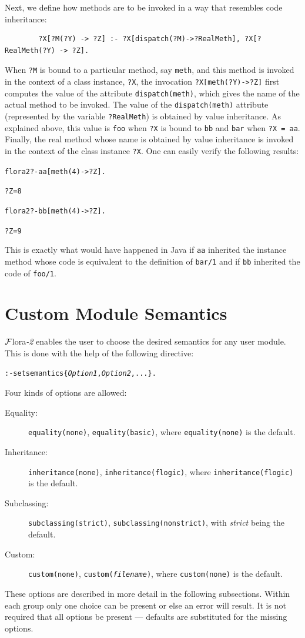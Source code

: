 \documentclass[11pt]{article}
\newcommand{\FLSYSTEM}{{\mbox{\sc ${\cal F}${lora}\rm\emph{-2}}}\xspace}
\newcommand{\prompt}{flora2 ?- }
\begin{document}
Next, we define how methods are to be invoked in a way that resembles
code inheritance:
\begin{verbatim}
        ?X[?M(?Y) -> ?Z] :- ?X[dispatch(?M)->?RealMeth], ?X[?RealMeth(?Y) -> ?Z].
\end{verbatim}
When {\tt ?M} is bound to a particular method, say {\tt meth}, and this
method is invoked in the context of a class instance, {\tt ?X}, the
invocation {\tt ?X[meth(?Y)->?Z]} first computes the value of the attribute
{\tt dispatch(meth)}, which gives the name of the actual method to be
invoked. The value of the {\tt dispatch(meth)} attribute (represented by
the variable {\tt ?RealMeth}) is obtained by
value inheritance.  As explained above, this value is
{\tt foo} when {\tt ?X} is bound to {\tt bb} and {\tt bar} when {\tt ?X =
  aa}.  Finally, the real method whose name is obtained by value
inheritance is invoked in the context of the class instance {\tt ?X}.  One
can easily verify the following results:
\begin{alltt}
    \prompt aa[meth(4) -> ?Z].

    ?Z = 8

    \prompt bb[meth(4) -> ?Z].

    ?Z = 9
\end{alltt}
This is exactly what would have happened in Java if {\tt aa} inherited
the instance method whose code is equivalent to the definition of
{\tt bar/1} and if {\tt bb} inherited the code of {\tt foo/1}.  


\section{Custom Module Semantics}\label{sec-semantics-directive}

\FLSYSTEM enables the user to choose the desired semantics for any user
module. This is done with the help of the following directive:
\begin{alltt}
  :- setsemantics\{\emph{Option1}, \emph{Option2}, ...\}.
\end{alltt}
Four kinds of options are allowed:
\begin{description}
  \item[Equality:]  {\tt equality(none)}, {\tt equality(basic)}, where
  {\tt equality(none)} is the default.
\item[Inheritance:] {\tt inheritance(none)}, {\tt inheritance(flogic)}, where
  {\tt inheritance(flogic)} is the default.
\item[Subclassing:] \texttt{subclassing(strict)},
  \texttt{subclassing(nonstrict)}, with \emph{strict} being the default.    
\item[Custom:] {\tt custom(none)}, {\tt custom(\emph{filename})}, where
  {\tt custom(none)} is the default.
\end{description}
These options are described in more detail in the following
subsections.
Within each group only one choice can be present or else an error will result.
It is not required that all options be present --- defaults are substituted
for the missing options.
\end{document}
